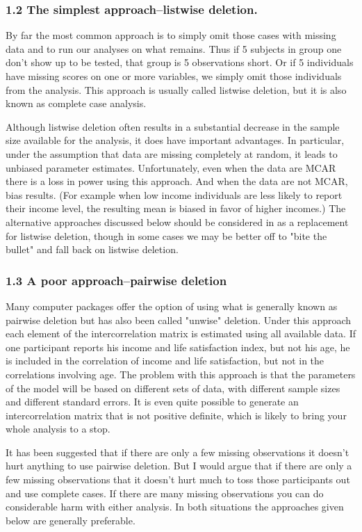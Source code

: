 \subsubsection{1.2 The simplest approach--listwise deletion.}

By far the most common approach is to simply omit those cases with missing data and to run our analyses on what remains. Thus if 5 subjects in group one don't show up to be tested, that group is 5 observations short.  Or if 5 individuals have missing scores on one or more variables, we simply omit those individuals from the analysis. This approach is usually called listwise deletion, but it is also known as complete case analysis. 

Although listwise deletion often results in a substantial decrease in the sample size available for the analysis, it does have important advantages. In particular, under the assumption that data are missing completely at random, it leads to unbiased parameter estimates. Unfortunately, even when the data are MCAR there is a loss in power using this approach. And when the data are not MCAR, bias results. (For example when low income individuals are less likely to report their income level, the resulting mean is biased in favor of higher incomes.) The alternative approaches discussed below should be considered in as a replacement for listwise deletion, though in some cases we may be better off to "bite the bullet" and fall back on listwise deletion.

\subsubsection{1.3 A poor approach--pairwise deletion}

Many computer packages offer the option of using what is generally known as pairwise deletion but has also been called "unwise" deletion. Under this approach each element of the intercorrelation matrix is estimated using all available data. If one participant reports his income and life satisfaction index, but not his age, he is included in the correlation of income and life satisfaction, but not in the correlations involving age. The problem with this approach is that the parameters of the model will be based on different sets of data, with different sample sizes and different standard errors. It is even quite possible to generate an intercorrelation matrix that is not positive definite, which is likely to bring your whole analysis to a stop.

It has been suggested that if there are only a few missing observations it doesn't hurt anything to use pairwise deletion. But I would argue that if there are only a few missing observations that it doesn't hurt much to toss those participants out and use complete cases. If there are many missing observations you can do considerable harm with either analysis. In both situations the approaches given below are generally preferable.





